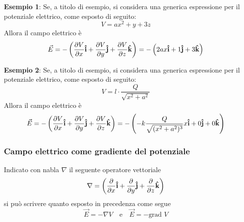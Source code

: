 \documentclass[a4paper]{extarticle}
\begin{document}
\vspace{1em}
\noindent
\textbf{Esempio 1}: Se, a titolo di esempio, si considera una generica espressione per il potenziale elettrico, come esposto di seguito:
\[V=ax^2+y+3z\]
Allora il campo elettrico è
\[\vec E = - \left(\frac{\partial V}{\partial x} {\bf{\hat i}} + \frac{\partial V}{\partial y} {\bf{\hat j}} + \frac{\partial V}{\partial z} {\bf{\hat k}}\right) = - \left(2ax {\bf{\hat i}} + 1 {\bf{\hat j}} + 3 {\bf{\hat k}}\right)\]

\vspace{1em}
\noindent
\textbf{Esempio 2}: Se, a titolo di esempio, si considera una generica espressione per il potenziale elettrico, come esposto di seguito:
\[V=l \cdot \frac{Q}{\sqrt{x^2+a^2}}\]
Allora il campo elettrico è
\[\vec E = - \left(\frac{\partial V}{\partial x} {\bf{\hat i}} + \frac{\partial V}{\partial y} {\bf{\hat j}} + \frac{\partial V}{\partial z} {\bf{\hat k}}\right) = - \left(-k\frac{Q}{\sqrt{(x^2+a^2)^3}} x {\bf{\hat i}} + 0 {\bf{\hat j}} + 0 {\bf{\hat k}}\right)\]

\vspace{1em}
\noindent
\subsubsection{Campo elettrico come gradiente del potenziale}
Indicato con nabla $\nabla$ il seguente operatore vettoriale
\[\nabla = \left(\frac{\partial}{\partial x} {\bf{\hat i}} + \frac{\partial}{\partial y} {\bf{\hat j}} + \frac{\partial}{\partial z} {\bf{\hat k}}\right)\]
si può scrivere quanto esposto in precedenza come segue
\[\boxed{\vec E = - \nabla V} \hspace{1em} \text{e} \hspace{1em} \boxed{\vec E = -\text{grad } V}\]

\vspace{1em}
\noindent
\end{document}
